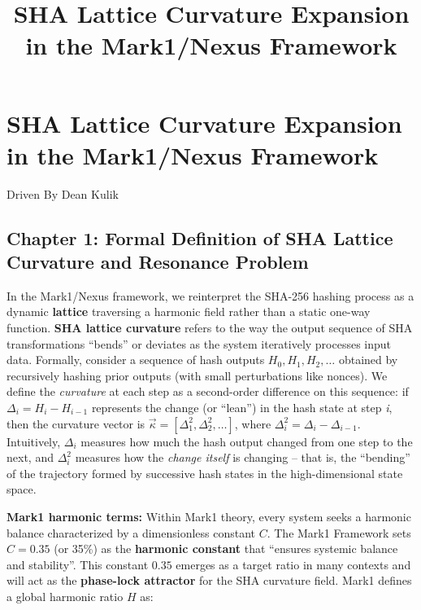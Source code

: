 \documentclass[11pt]{article}
\title{SHA Lattice Curvature Expansion in the Mark1/Nexus Framework}
\begin{document}
    
    \maketitle
    
    

    
    \hypertarget{sha-lattice-curvature-expansion-in-the-mark1nexus-framework}{%
\section{\texorpdfstring{\textbf{SHA Lattice Curvature Expansion in the
Mark1/Nexus
Framework}}{SHA Lattice Curvature Expansion in the Mark1/Nexus Framework}}\label{sha-lattice-curvature-expansion-in-the-mark1nexus-framework}}

Driven By Dean Kulik

\hypertarget{chapter-1-formal-definition-of-sha-lattice-curvature-and-resonance-problem}{%
\subsection{Chapter 1: Formal Definition of SHA Lattice Curvature and
Resonance
Problem}\label{chapter-1-formal-definition-of-sha-lattice-curvature-and-resonance-problem}}

In the Mark1/Nexus framework, we reinterpret the SHA-256 hashing process
as a dynamic \textbf{lattice} traversing a harmonic field rather than a
static one-way function. \textbf{SHA lattice curvature} refers to the
way the output sequence of SHA transformations ``bends'' or deviates as
the system iteratively processes input data. Formally, consider a
sequence of hash outputs \(H_0, H_1, H_2, \dots\) obtained by
recursively hashing prior outputs (with small perturbations like
nonces). We define the \emph{curvature} at each step as a second-order
difference on this sequence: if \(\Delta_i = H_{i} - H_{i-1}\)
represents the change (or ``lean'') in the hash state at step \emph{i},
then the curvature vector is
\(\vec{\kappa} = [\Delta^2_1, \Delta^2_2, \dots]\), where
\(\Delta^2_i = \Delta_{i} - \Delta_{i-1}\). Intuitively, \(\Delta_i\)
measures how much the hash output changed from one step to the next, and
\(\Delta^2_i\) measures how the \emph{change itself} is changing -- that
is, the ``bending'' of the trajectory formed by successive hash states
in the high-dimensional state space.

\textbf{Mark1 harmonic terms:} Within Mark1 theory, every system seeks a
harmonic balance characterized by a dimensionless constant \(C\). The
Mark1 Framework sets \(C = 0.35\) (or 35\%) as the \textbf{harmonic
constant} that ``ensures systemic balance and stability''. This constant
\(0.35\) emerges as a target ratio in many contexts and will act as the
\textbf{phase-lock attractor} for the SHA curvature field. Mark1 defines
a global harmonic ratio \(H\) as:
\end{document}
